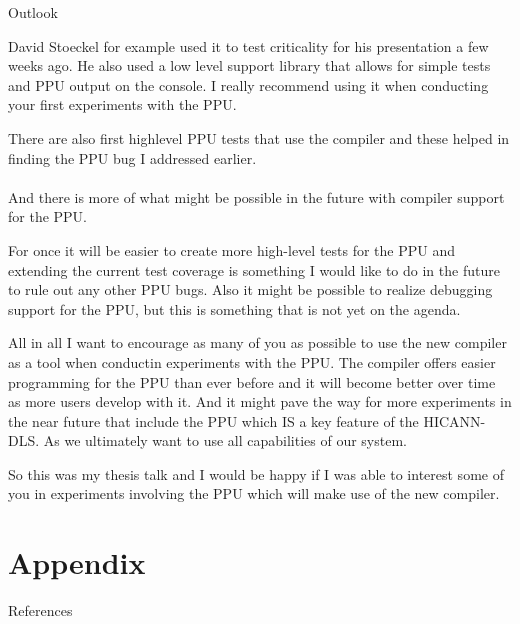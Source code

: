 \documentclass[10pt,aspectratio=169]{beamer}
\begin{document}
\begin{frame}[fragile]{Outlook}
{		David Stoeckel for example used it to test criticality for his presentation a few weeks ago.
		He also used a low level support library that allows for simple tests and PPU output on the console.
		I really recommend using it when conducting your first experiments with the PPU.

		There are also first highlevel PPU tests that use the compiler and these helped in finding the PPU bug I addressed earlier.
		\\
		\\
		And there is more of what might be possible in the future with compiler support for the PPU.

		For once it will be easier to create more high-level tests for the PPU and extending the current test coverage is something I would like to do in the future to rule out any other PPU bugs.
		Also it might be possible to realize debugging support for the PPU, but this is something that is not yet on the agenda.

		All in all I want to encourage as many of you as possible to use the new compiler as a tool when conductin experiments with the PPU.
		The compiler offers easier programming for the PPU than ever before and it will become better over time as more users develop with it.
		And it might pave the way for more experiments in the near future that include the PPU which IS a key feature of the HICANN-DLS.
		As we ultimately want to use all capabilities of our system.

		So this was my thesis talk and I would be happy if I was able to interest some of you in experiments involving the PPU which will make use of the new compiler.
}
\end{frame}

\appendix



\section{Appendix}
\nocite{PPU}
\nocite{microprocessor}
\nocite{UBHD-67548259}
\nocite{UBHD-66483012}
\nocite{nuxmanual}
\nocite{GCCint}

\begin{frame}[fragile]{References}
	\vspace*{3em}
	{\scriptsize
	\printbibliography}
\end{frame}

\scriptsize
\end{document}
